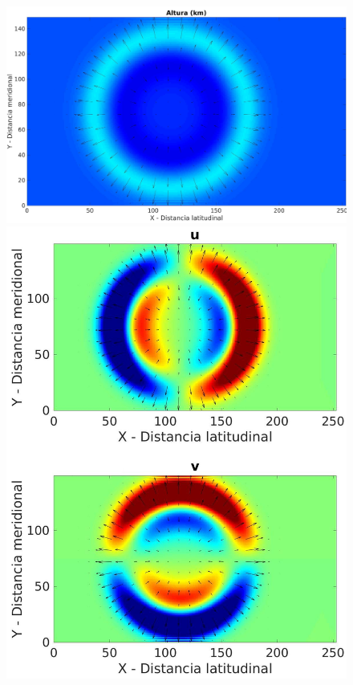 \documentclass[12pt,dvipsnames]{exam}
\begin{document}
\begin{figure}[H]
\begin{minipage}[b]{0.5\linewidth} 
\centering
\includegraphics[scale=0.2]{hd.jpeg}
\caption{ }
\end{minipage}
\hspace{0.1cm} 
\begin{minipage}[b]{0.5\linewidth}
\centering
\includegraphics[scale=0.35]{uvd.jpeg}
\caption{}
\end{minipage}
\end{figure}
\end{document}
